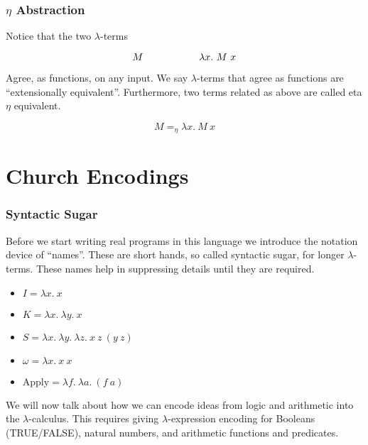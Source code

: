 \documentclass{beamer}
\begin{document}
\begin{frame}
	\frametitle{$\eta$ Abstraction}

	Notice that the two $\lambda$-terms 

	$$M \hspace{20mm} \lambda x. \ M \ x$$ 

	Agree, as functions, on any input. We say $\lambda$-terms that agree as functions are ``extensionally equivalent''. Furthermore, two terms related as above are called eta $\eta$ equivalent. 

	$$ M =_{\eta} \lambda x. \ M \ x$$

	\hspace{50mm}

\end{frame}

\section{Church Encodings}

\begin{frame}
	\frametitle{Syntactic Sugar}

	
	Before we start writing real programs in this language we introduce the notation device of ``names''. These are short hands, so called syntactic sugar, for longer $\lambda$-terms. These names help in suppressing details until they are required. %

	\begin{itemize}
		\item[] $I = \lambda x. \ x$
		\item[] $K = \lambda x. \ \lambda y. \ x$
		\item[] $S = \lambda x. \ \lambda y. \ \lambda z. \ x \ z \ (y \ z)$
		\item[] $\omega = \lambda x. \ x \ x$
		\item[] $\text{Apply} = \lambda f. \ \lambda a. \ (f \ a)$
	\end{itemize}

	We will now talk about how we can encode ideas from logic and arithmetic into the $\lambda$-calculus. This requires giving $\lambda$-expression encoding for Booleans (TRUE/FALSE), natural numbers, and arithmetic functions and predicates.

\end{frame}
\end{document}

